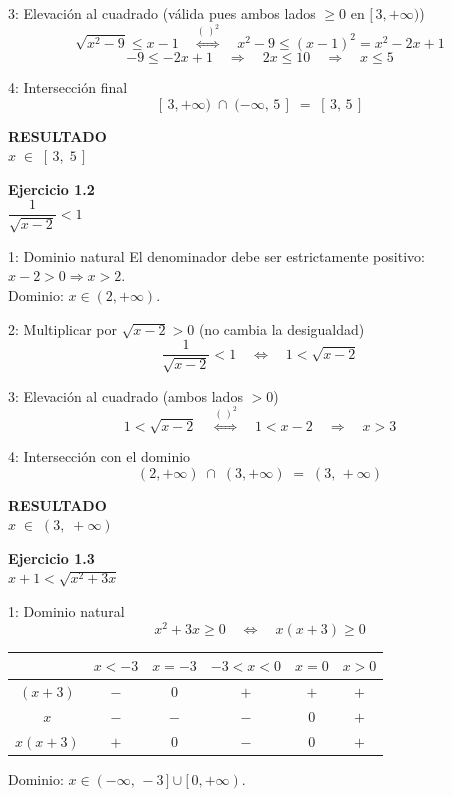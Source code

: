 \documentclass[letterpaper, 11pt]{article}
\newcommand{\exheader}[2]{%
    \begin{tcolorbox}[colback=azulFuerte!12, colframe=azulFuerte,
        arc=8pt, boxrule=1.5pt, enhanced]
        {\large\textbf{\color{azulFuerte}Ejercicio #1}} \\[0.4em]
        \centering\LARGE $\displaystyle #2$
    \end{tcolorbox}
    \smallskip}
\newcommand{\resultado}[1]{%
    \begin{tcolorbox}[colback=azulFuerte, colframe=azulFuerte, colupper=white,
        arc=8pt, boxrule=1.5pt, enhanced, drop shadow={black!12}]
        \centering\large\textbf{RESULTADO} \\[0.4em]
        \LARGE $\displaystyle #1$
    \end{tcolorbox}}
\begin{document}
\begin{paso}{3: Elevación al cuadrado (válida pues ambos lados $\geq 0$ en $[\,3,+\infty)$)}
\[
    \sqrt{x^2-9} \leq x-1
    \quad\stackrel{(\,)^2}{\Longleftrightarrow}\quad
    x^2 - 9 \leq (x-1)^2 = x^2 - 2x + 1
\]
\[
    -9 \leq -2x + 1 \quad\Longrightarrow\quad 2x \leq 10 \quad\Longrightarrow\quad x \leq 5
\]
\end{paso}

\begin{paso}{4: Intersección final}
\[
    [\,3,+\infty) \;\cap\; (-\infty,\,5\,] \;=\; [\,3,\,5\,]
\]
\end{paso}

\resultado{x \;\in\; [\,3,\;5\,]}

\clearpage

\exheader{1.2}{\dfrac{1}{\sqrt{x-2}} < 1}

\begin{paso}{1: Dominio natural}
El denominador debe ser estrictamente positivo: $x - 2 > 0 \Rightarrow x > 2$.\\
Dominio: $x \in (2,+\infty)$.
\end{paso}

\begin{paso}{2: Multiplicar por $\sqrt{x-2} > 0$ (no cambia la desigualdad)}
\[
    \frac{1}{\sqrt{x-2}} < 1
    \quad\Longleftrightarrow\quad
    1 < \sqrt{x-2}
\]
\end{paso}

\begin{paso}{3: Elevación al cuadrado (ambos lados $> 0$)}
\[
    1 < \sqrt{x-2}
    \quad\stackrel{(\,)^2}{\Longleftrightarrow}\quad
    1 < x - 2
    \quad\Longrightarrow\quad
    x > 3
\]
\end{paso}

\begin{paso}{4: Intersección con el dominio}
\[
    (2,+\infty) \;\cap\; (3,+\infty) \;=\; (3,\,+\infty)
\]
\end{paso}

\resultado{x \;\in\; (3,\;+\infty)}

\clearpage

\exheader{1.3}{x + 1 < \sqrt{x^2 + 3x}}

\begin{paso}{1: Dominio natural}
\[
    x^2 + 3x \geq 0 \quad\Longleftrightarrow\quad x(x+3) \geq 0
\]
\begin{center}
\renewcommand{\arraystretch}{1.6}
\begin{tabular}{c|ccccc}
    & $x < -3$ & $x = -3$ & $-3 < x < 0$ & $x = 0$ & $x > 0$ \\
\hline
$(x+3)$ & $-$ & $0$ & $+$ & $+$ & $+$ \\
$x$     & $-$ & $-$ & $-$ & $0$ & $+$ \\
\hline
\rowcolor{celesteSuave}
$x(x+3)$ & $+$ & $0$ & $-$ & $0$ & $+$ \\
\end{tabular}
\end{center}
Dominio: $x \in (-\infty,\,-3\,]\cup[\,0,+\infty)$.
\end{paso}
\end{document}
